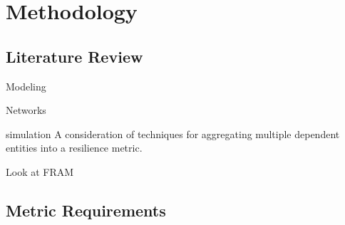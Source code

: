 
\renewcommand{\thechapter}{4}

\chapter{Methodology}

\section{Literature Review}
Modeling

Networks

simulation
A consideration of techniques for aggregating multiple dependent
entities into a resilience metric.

Look at FRAM


\section{Metric Requirements}
